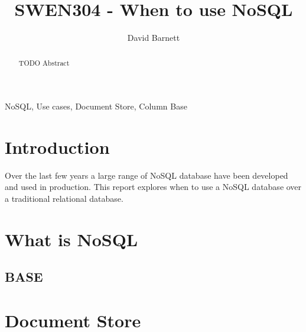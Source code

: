 \documentclass{CRPITStyle}
\renewcommand{\cite}{\citep}
\begin{document}
\title{SWEN304 - When to use NoSQL}
\author{David Barnett}

\maketitle

\begin{abstract}
    TODO Abstract
\end{abstract}

\vspace{.1in}

 NoSQL, Use cases, Document Store, Column Base

\section{Introduction}

Over the last few years a large range of NoSQL database have been developed
and used in production.
This report explores when to use a NoSQL database over a traditional relational
database.

\cite{whats_new}
\cite{sql_nosql_gap}
\cite{scalable_sql}

\section{What is NoSQL}


\subsection{BASE}

\section{Document Store}
\end{document}
